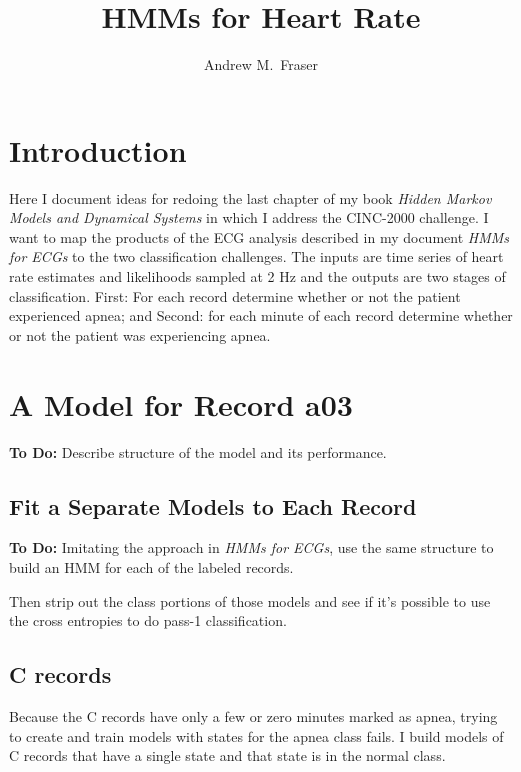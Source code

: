 \documentclass[12pt]{article}
\title{HMMs for Heart Rate}
\author{Andrew M.\ Fraser}
\begin{document}
\maketitle

\section{Introduction}
\label{sec:introduction}

Here I document ideas for redoing the last chapter of my book
\emph{Hidden Markov Models and Dynamical Systems} in which I address
the CINC-2000 challenge.  I want to map the products of the ECG
analysis described in my document \emph{HMMs for ECGs} to the two
classification challenges.  The inputs are time series of heart rate
estimates and likelihoods sampled at 2 Hz and the outputs are two
stages of classification.  First: For each record determine whether or
not the patient experienced apnea; and Second: for each minute of each
record determine whether or not the patient was experiencing apnea.

\section{A Model for Record a03}
\label{sec:a03}

\textbf{To Do:}  Describe structure of the model and its performance.

\subsection{Fit a Separate Models to Each Record}
\label{sec:selves}

\textbf{To Do:} Imitating the approach in \emph{HMMs for ECGs}, use
the same structure to build an HMM for each of the labeled records.

Then strip out the class portions of those models and see if it's
possible to use the cross entropies to do pass-1 classification.

\subsection{C records}
\label{sec:c_records}

Because the C records have only a few or zero minutes marked as apnea,
trying to create and train models with states for the apnea class
fails.  I build models of C records that have a single state and that
state is in the normal class.
\end{document}
